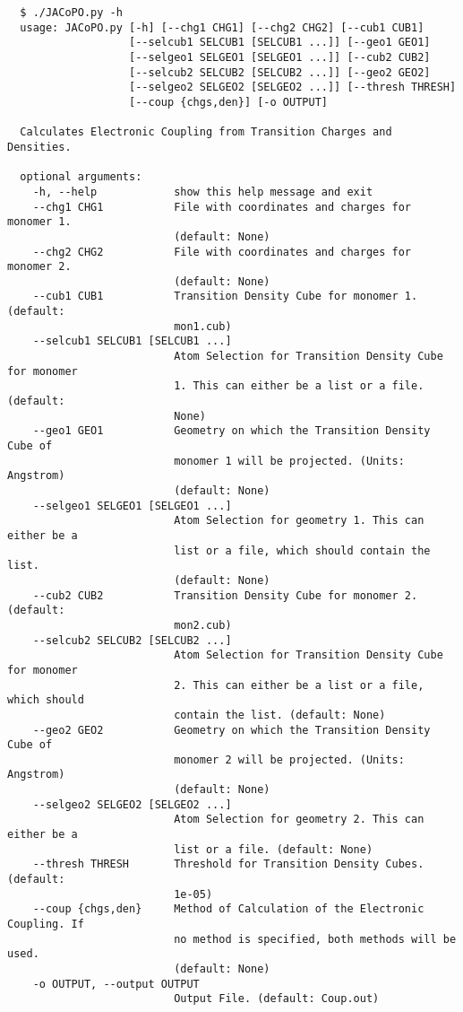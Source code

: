 \documentclass[a4paper]{article}
\begin{document}
\begin{verbatim}
  $ ./JACoPO.py -h
  usage: JACoPO.py [-h] [--chg1 CHG1] [--chg2 CHG2] [--cub1 CUB1]
                   [--selcub1 SELCUB1 [SELCUB1 ...]] [--geo1 GEO1]
                   [--selgeo1 SELGEO1 [SELGEO1 ...]] [--cub2 CUB2]
                   [--selcub2 SELCUB2 [SELCUB2 ...]] [--geo2 GEO2]
                   [--selgeo2 SELGEO2 [SELGEO2 ...]] [--thresh THRESH]
                   [--coup {chgs,den}] [-o OUTPUT]
  
  Calculates Electronic Coupling from Transition Charges and Densities.
  
  optional arguments:
    -h, --help            show this help message and exit
    --chg1 CHG1           File with coordinates and charges for monomer 1.
                          (default: None)
    --chg2 CHG2           File with coordinates and charges for monomer 2.
                          (default: None)
    --cub1 CUB1           Transition Density Cube for monomer 1. (default:
                          mon1.cub)
    --selcub1 SELCUB1 [SELCUB1 ...]
                          Atom Selection for Transition Density Cube for monomer
                          1. This can either be a list or a file. (default:
                          None)
    --geo1 GEO1           Geometry on which the Transition Density Cube of
                          monomer 1 will be projected. (Units: Angstrom)
                          (default: None)
    --selgeo1 SELGEO1 [SELGEO1 ...]
                          Atom Selection for geometry 1. This can either be a
                          list or a file, which should contain the list.
                          (default: None)
    --cub2 CUB2           Transition Density Cube for monomer 2. (default:
                          mon2.cub)
    --selcub2 SELCUB2 [SELCUB2 ...]
                          Atom Selection for Transition Density Cube for monomer
                          2. This can either be a list or a file, which should
                          contain the list. (default: None)
    --geo2 GEO2           Geometry on which the Transition Density Cube of
                          monomer 2 will be projected. (Units: Angstrom)
                          (default: None)
    --selgeo2 SELGEO2 [SELGEO2 ...]
                          Atom Selection for geometry 2. This can either be a
                          list or a file. (default: None)
    --thresh THRESH       Threshold for Transition Density Cubes. (default:
                          1e-05)
    --coup {chgs,den}     Method of Calculation of the Electronic Coupling. If
                          no method is specified, both methods will be used.
                          (default: None)
    -o OUTPUT, --output OUTPUT
                          Output File. (default: Coup.out)

\end{verbatim}
\end{document}
